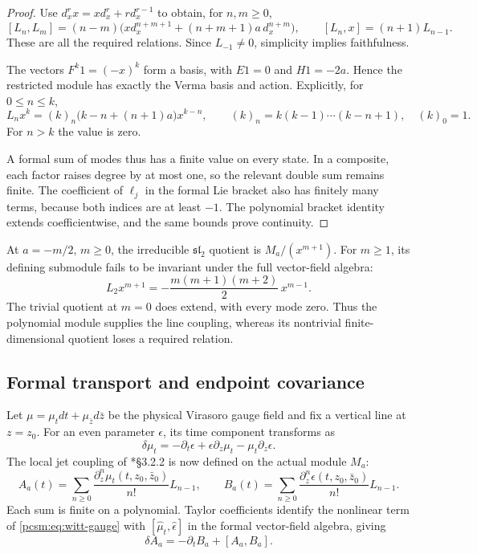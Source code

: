 \begin{proof}
Use \(d_x^r x=xd_x^r+r d_x^{r-1}\) to obtain, for \(n,m\geq0\),
\[
 [L_n,L_m]=(n-m)
       \bigl(xd_x^{n+m+1}+(n+m+1)a\,d_x^{n+m}\bigr),
 \qquad [L_n,x]=(n+1)L_{n-1}.
\]
These are all the required relations.
Since \(L_{-1}\ne0\), simplicity implies faithfulness.

The vectors \(F^k1=(-x)^k\) form a basis, with
\(E1=0\) and \(H1=-2a\). Hence the restricted module has
exactly the Verma basis and action.
Explicitly, for \(0\leq n\leq k\),
\[
 L_nx^k=(k)_n\bigl(k-n+(n+1)a\bigr)x^{k-n},
 \qquad (k)_n=k(k-1)\cdots(k-n+1),\quad(k)_0=1.
\]
For \(n>k\) the value is zero.

A formal sum of modes thus has a finite value on every state.
In a composite, each factor raises degree by at most one, so the
relevant double sum remains finite.
The coefficient of \(\ell_j\) in the formal Lie bracket also
has finitely many terms, because both indices are at least \(-1\).
The polynomial bracket identity extends coefficientwise, and the
same bounds prove continuity.
\end{proof}

At \(a=-m/2\), \(m\geq0\), the irreducible
\(\mathfrak{sl}_2\) quotient is \(M_a/(x^{m+1})\).
For \(m\geq1\), its defining submodule fails to be invariant
under the full vector-field algebra:
\begin{equation}\label{pcsm:eq:witt-quotient-defect}
 L_2x^{m+1}=-\frac{m(m+1)(m+2)}2\,x^{m-1}.
\end{equation}
The trivial quotient at \(m=0\) does extend, with every mode zero.
Thus the polynomial module supplies the line coupling, whereas its
nontrivial finite-dimensional quotient loses a required relation.

\subsection{Formal transport and endpoint covariance}

Let\label{pcsm:def:virasoro-gauge-field} \(\mu=\mu_tdt+\mu_{\bar z}d\bar z\) be the physical
Virasoro gauge field and fix a vertical line at \(z=z_0\).
For an even parameter \(\epsilon\), its time component transforms as
\begin{equation}\label{pcsm:eq:witt-gauge}
 \delta\mu_t=-\partial_t\epsilon
                   +\epsilon\partial_z\mu_t-\mu_t\partial_z\epsilon.
\end{equation}
The local jet coupling of \cite{pcsm:KZ}*{\S3.2.2} is now defined
on the actual module \(M_a\):
\[
 A_a(t)=\sum_{n\geq0}
     \frac{\partial_z^n\mu_t(t,z_0,\bar z_0)}{n!}L_{n-1},
 \qquad
 B_a(t)=\sum_{n\geq0}
     \frac{\partial_z^n\epsilon(t,z_0,\bar z_0)}{n!}L_{n-1}.
\]
Each sum is finite on a polynomial.
Taylor coefficients identify the nonlinear term of
\eqref{pcsm:eq:witt-gauge} with
\([\widehat\mu_t,\widehat\epsilon]\) in the formal vector-field
algebra, giving
\begin{equation}\label{pcsm:eq:witt-connection-gauge}
 \delta A_a=-\partial_tB_a+[A_a,B_a].
\end{equation}

